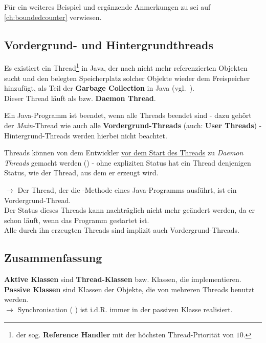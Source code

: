 \noindent
Für ein weiteres Beispiel und ergänzende Anmerkungen zu  sei auf \ref{ch:boundedcounter} verwiesen.

\subsection{Vordergrund- und Hintergrundthreads}

Es existiert ein Thread\footnote{
der sog. \textbf{Reference Handler} mit der höchsten Thread-Priorität von $10$.
} in Java, der nach nicht mehr referenzierten Objekten sucht und den belegten Speicherplatz solcher Objekte wieder dem Freispeicher hinzufügt, als Teil der \textbf{Garbage Collection} in Java (vgl.~\cite[88]{Oec22}).\\
\noindent
Dieser Thread läuft als  bzw. \textbf{Daemon Thread}.

\begin{tcolorbox}[enlarge top by=0.5cm,enlarge bottom by=0.5cm]
Ein Java-Programm ist beendet, wenn alle Threads beendet sind - dazu gehört der \textit{Main}-Thread wie auch alle \textbf{Vordergrund-Threads} (auch: \textbf{User Threads}) - Hintergrund-Threads werden hierbei nicht beachtet.\\
\end{tcolorbox}

\noindent
Threads können von dem Entwickler \ul{vor dem Start des Threads} zu \textit{Daemon Threads} gemacht werden () - ohne expliziten Status hat ein Thread denjenigen Status, wie der Thread, aus dem er erzeugt wird.

\noindent
$\rightarrow$ Der Thread, der die -Methode eines Java-Programms ausführt, ist ein Vordergrund-Thread.\\
Der Status dieses Threads kann nachträglich nicht mehr geändert werden, da er schon läuft, wenn das Programm gestartet ist.\\
Alle durch ihn erzeugten Threads sind implizit auch Vordergrund-Threads.

\subsection{Zusammenfassung}\label{subsec:syncsummary}

\begin{tcolorbox}[enlarge top by=0.5cm,enlarge bottom by=0.5cm]
\textbf{Aktive Klassen} sind \textbf{Thread-Klassen} bzw. Klassen, die  implementieren.\\

\noindent
\textbf{Passive Klassen} sind Klassen der Objekte, die von mehreren Threads benutzt werden.\\

\noindent
$\rightarrow$ Synchronisation ( ) ist i.d.R. immer in der passiven Klasse realisiert.
\end{tcolorbox}


